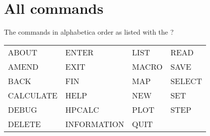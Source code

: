 \documentclass[12pt]{article}
\begin{document}
%
%

\section{All commands}

The commands in alphabetica order as listed with the ?

\begin{tabular}{llll}
ABOUT           & ENTER           & LIST           & READ    \\
AMEND           & EXIT            & MACRO          & SAVE    \\
BACK            & FIN             & MAP            & SELECT  \\
CALCULATE       & HELP            & NEW            & SET     \\
DEBUG           & HPCALC          & PLOT           & STEP    \\
DELETE          & INFORMATION     & QUIT                     \\
\end{tabular}
\end{document}
